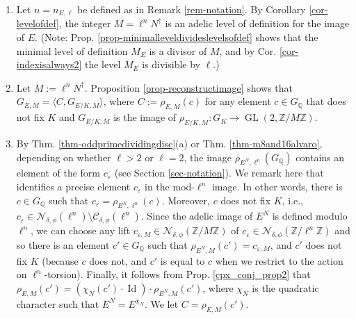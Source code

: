 \documentclass[11pt]{amsart}
\theoremstyle{definition}
\newcommand{\Q}{\mathbb{Q}}
\newcommand{\Z}{\mathbb{Z}}
\newcommand{\GL}{\operatorname{GL}}
\DeclareMathOperator{\Id}{Id}  %
\begin{document}
\begin{enumerate}
    \item Let $n = n_{E, \ell}$ be defined as in Remark \ref{rem-notation}. By Corollary \ref{cor-levelofdef}, the integer $M=\ell^n N^\dagger$ is an adelic level of definition for the image of $E$. (Note: Prop. \ref{prop-minimalleveldivideslevelsofdef} shows that the minimal level of definition $M_E$ is a divisor of $M$, and by Cor. \ref{cor-indexisalways2} the level $M_E$ is divisible by $\ell$.) 
    \item Let $M := \ell^n N^\dagger$. Proposition \ref{prop-reconstructimage} shows that $G_{E, M} = \langle C, G_{E/K, M} \rangle$, where $C := \rho_{E, M}(c)$ for any element $c \in G_{\Q}$ that does not fix $K$ and $G_{E/K, M}$ is the image of $\rho_{E/K, M} \colon G_{K} \to \GL(2, \Z/M\Z)$. 
    \item By Thm. \ref{thm-oddprimedividingdisc}(a) or Thm. \ref{thm-m8and16alvaro}, depending on whether $\ell > 2$ or $\ell = 2$, the image $\rho_{E^N,\ell^n}(G_\Q)$ contains an element of the form $c_\varepsilon$ (see Section \ref{sec-notation}). We remark here that \cite{modelspaper} identifies a precise element $c_\varepsilon$ in the mod-$\ell^n$ image. In other words, there is $c\in G_\Q$ such that $c_\varepsilon = \rho_{E^N,\ell^n}(c)$. Moreover, $c$ does not fix $K$, i.e., $c_\varepsilon \in \mathcal{N}_{\delta, \phi}(\ell^n)\setminus \mathcal{C}_{\delta, \phi}(\ell^n)$. Since the adelic image of $E^N$ is defined modulo $\ell^n$, we can choose any lift $c_{\varepsilon,M} \in \mathcal{N}_{\delta, \phi}(\Z/M\Z)$ of $c_{\varepsilon}\in \mathcal{N}_{\delta, \phi}(\Z/\ell^n\Z)$ and so there is an element $c'\in G_\Q$ such that $\rho_{E^N,M}(c')=c_{\varepsilon,M}$, and $c'$ does not fix $K$ (because $c$ does not, and $c'$ is equal to $c$ when we restrict to the action on $\ell^n$-torsion). Finally, it follows from Prop. \ref{cpx_conj_prop2} that $\rho_{E, M}(c') = (\chi_{N}(c') \cdot \Id) \cdot \rho_{E^N, M}(c')$, where $\chi_{N}$ is the quadratic character such that $E^N = E^{\chi_N}$. We let $C=\rho_{E,M}(c')$.
    

\end{enumerate}
\end{document}

